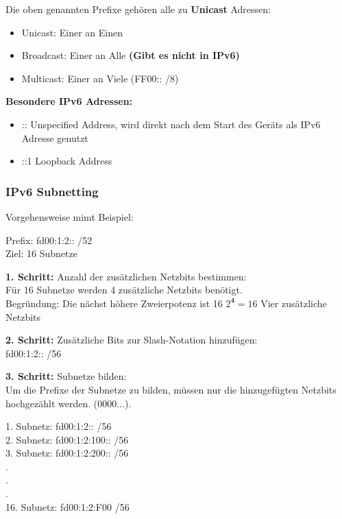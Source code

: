 \documentclass[10pt]{article}
\begin{document}
Die oben genannten Prefixe gehören alle zu \textbf{Unicast} Adressen:
\begin{itemize}
    \item Unicast: Einer an Einen
    \item Broadcast: Einer an Alle \textbf{(Gibt es nicht in IPv6)}
    \item Multicast: Einer an Viele (FF00:: /8)
\end{itemize}

\textbf{Besondere IPv6 Adressen:}
\begin{itemize}
    \item :: \textrightarrow\space Unspecified Address, wird direkt nach dem Start des Geräts als IPv6 Adresse genutzt
    \item ::1 \textrightarrow\space Loopback Address 
\end{itemize}

\subsubsection{IPv6 Subnetting}

Vorgehensweise mimt Beispiel:

Prefix: fd00:1:2:: /52 \\
Ziel: 16 Subnetze

\textbf{1. Schritt:} Anzahl der zusätzlichen Netzbits bestimmen:\\
Für 16 Subnetze werden 4 zusätzliche Netzbits benötigt.\\
Begründung: Die nächst höhere Zweierpotenz ist 16 \textrightarrow\space \(2^\textbf{4} = 16\) \textrightarrow\space Vier zusätzliche Netzbits

\textbf{2. Schritt:} Zusätzliche Bits zur Slash-Notation hinzufügen:\\
fd00:1:2:: /56

\textbf{3. Schritt:} Subnetze bilden:\\
Um die Prefixe der Subnetze zu bilden, müssen nur die  hinzugefügten Netzbits hochgezählt werden. (0000\textrightarrow{}\textrightarrow{}\textrightarrow\space...).

1. Subnetz: fd00:1:2:: /56\\
2. Subnetz: fd00:1:2:100:: /56\\
3. Subnetz: fd00:1:2:200:: /56\\
.\\
.\\
.\\
16. Subnetz: fd00:1:2:F00 /56\\
\end{document}
